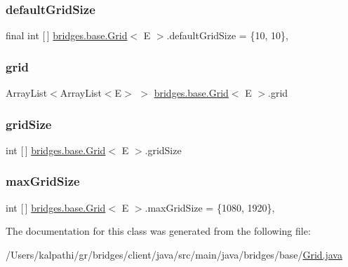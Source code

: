 \subsubsection{\texorpdfstring{default\+Grid\+Size}{defaultGridSize}}
{\footnotesize\ttfamily final int \mbox{[}$\,$\mbox{]} \mbox{\hyperlink{classbridges_1_1base_1_1_grid}{bridges.\+base.\+Grid}}$<$ E $>$.default\+Grid\+Size = \{10, 10\}\hspace{0.3cm}{\ttfamily [static]}, {\ttfamily [protected]}}

\mbox{\label{classbridges_1_1base_1_1_grid_ad1f3f6968d58188425bd992c05c655a6}} 
\subsubsection{\texorpdfstring{grid}{grid}}
{\footnotesize\ttfamily Array\+List$<$Array\+List$<$E$>$ $>$ \mbox{\hyperlink{classbridges_1_1base_1_1_grid}{bridges.\+base.\+Grid}}$<$ E $>$.grid\hspace{0.3cm}{\ttfamily [protected]}}

\mbox{\label{classbridges_1_1base_1_1_grid_a54a66479f78022570253d771206a0420}} 
\subsubsection{\texorpdfstring{grid\+Size}{gridSize}}
{\footnotesize\ttfamily int \mbox{[}$\,$\mbox{]} \mbox{\hyperlink{classbridges_1_1base_1_1_grid}{bridges.\+base.\+Grid}}$<$ E $>$.grid\+Size\hspace{0.3cm}{\ttfamily [protected]}}

\mbox{\label{classbridges_1_1base_1_1_grid_a803fd4c070a22863c82581f0bb258c1c}} 
\subsubsection{\texorpdfstring{max\+Grid\+Size}{maxGridSize}}
{\footnotesize\ttfamily int \mbox{[}$\,$\mbox{]} \mbox{\hyperlink{classbridges_1_1base_1_1_grid}{bridges.\+base.\+Grid}}$<$ E $>$.max\+Grid\+Size = \{1080, 1920\}\hspace{0.3cm}{\ttfamily [static]}, {\ttfamily [protected]}}



The documentation for this class was generated from the following file\+:\begin{DoxyCompactItemize}
\item 
/\+Users/kalpathi/gr/bridges/client/java/src/main/java/bridges/base/\mbox{\hyperlink{_grid_8java}{Grid.\+java}}\end{DoxyCompactItemize}
